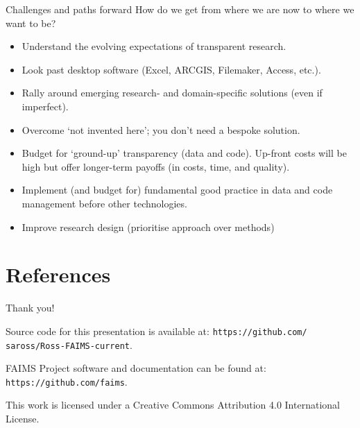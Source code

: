 \documentclass[aspectratio=169, 12pt]{beamer} %
\begin{document}
\begin{frame}{Challenges and paths forward}
  How do we get from where we are now to where we want to be?
      \begin{itemize}[label=\textbullet]
        \item Understand the evolving expectations of transparent research. 
        \item Look past desktop software (Excel, ARCGIS, Filemaker, Access, etc.).
        \item Rally around emerging research- and domain-specific solutions (even if imperfect).
        \item Overcome `not invented here'; you don't need a bespoke solution.
        \item Budget for `ground-up' transparency (data and code). Up-front costs will be high but offer longer-term payoffs (in costs, time, and quality).
        \item Implement (and budget for) fundamental good practice in data and code management before other technologies.
        \item Improve research design (prioritise approach over methods) \cite{Muthukrishna2019-kt, Hole1973-cy}
    \end{itemize}
\end{frame}
% 

 

\section{References}

  
%   
%   


\begin{frame}{Thank you!}


Source code for this presentation is available at: 
\texttt{https://github.com/ saross/Ross-FAIMS-current}.

FAIMS Project software and documentation can be found at:
\texttt{https://github.com/faims}.

This work is licensed under a Creative Commons Attribution 4.0 International License.

\end{frame}
\end{document}

